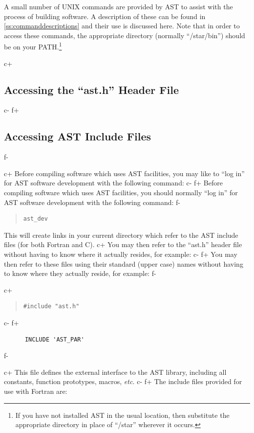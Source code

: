 \documentclass[twoside,11pt]{article}
\newcommand{\appref}[1]{Appendix~\ref{#1}}
\renewcommand{\appref}[1]{\ref{#1}}
\begin{document}
A small number of UNIX commands are provided by AST to assist with the
process of building software. A description of these can be found in
\appref{ss:commanddescriptions} and their use is discussed here.  Note
that in order to access these commands, the appropriate directory
(normally ``/star/bin'') should be on your PATH.\footnote{If you have
not installed AST in the usual location, then substitute the
appropriate directory in place of ``/star'' wherever it occurs.}

c+
\subsection{\label{ss:accessingheaderfile}Accessing the ``ast.h'' Header File}
c-
f+
\subsection{\label{ss:accessingheaderfile}Accessing AST Include Files}
f-

c+
Before compiling software which uses AST facilities, you may like to
``log in'' for AST software development with the following command:
c-
f+
Before compiling software which uses AST facilities, you should
normally ``log in'' for AST software development with the following
command:
f-

\begin{quote}
\small
\begin{verbatim}
ast_dev
\end{verbatim}
\normalsize
\end{quote}

This will create links in your current directory which refer to the
AST include files (for both Fortran and C).
c+
You may then refer to the ``ast.h'' header file without having to know
where it actually resides, for example:
c-
f+
You may then refer to these files using their standard (upper case)
names without having to know where they actually reside, for example:
f-

c+
\begin{quote}
\small
\begin{verbatim}
#include "ast.h"
\end{verbatim}
\normalsize
\end{quote}
c-
f+
\small
\begin{verbatim}
      INCLUDE 'AST_PAR'
\end{verbatim}
\normalsize
f-

c+
This file defines the external interface to the AST library, including
all constants, function prototypes, macros, {\em{etc.}}
c-
f+
The include files provided for use with Fortran are:
\end{document}
